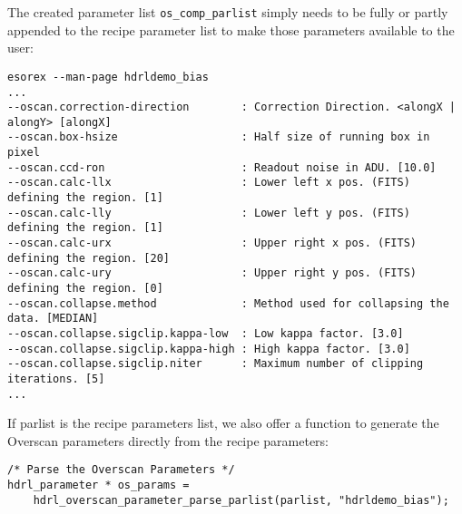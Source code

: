 The created parameter list \verb+os_comp_parlist+ simply needs to be fully or
partly appended to the recipe parameter list to make those parameters 
available to the user:
{\footnotesize 
\begin{verbatim}
esorex --man-page hdrldemo_bias
...
--oscan.correction-direction        : Correction Direction. <alongX | alongY> [alongX]
--oscan.box-hsize                   : Half size of running box in pixel
--oscan.ccd-ron                     : Readout noise in ADU. [10.0]
--oscan.calc-llx                    : Lower left x pos. (FITS) defining the region. [1]
--oscan.calc-lly                    : Lower left y pos. (FITS) defining the region. [1]
--oscan.calc-urx                    : Upper right x pos. (FITS) defining the region. [20]
--oscan.calc-ury                    : Upper right y pos. (FITS) defining the region. [0]
--oscan.collapse.method             : Method used for collapsing the data. [MEDIAN]
--oscan.collapse.sigclip.kappa-low  : Low kappa factor. [3.0]
--oscan.collapse.sigclip.kappa-high : High kappa factor. [3.0]
--oscan.collapse.sigclip.niter      : Maximum number of clipping iterations. [5]
...
\end{verbatim}
}
If parlist is the recipe parameters list, we also offer a function to 
generate the Overscan parameters directly from the recipe parameters:

\begin{lstlisting}
/* Parse the Overscan Parameters */
hdrl_parameter * os_params = 
    hdrl_overscan_parameter_parse_parlist(parlist, "hdrldemo_bias");
\end{lstlisting}

